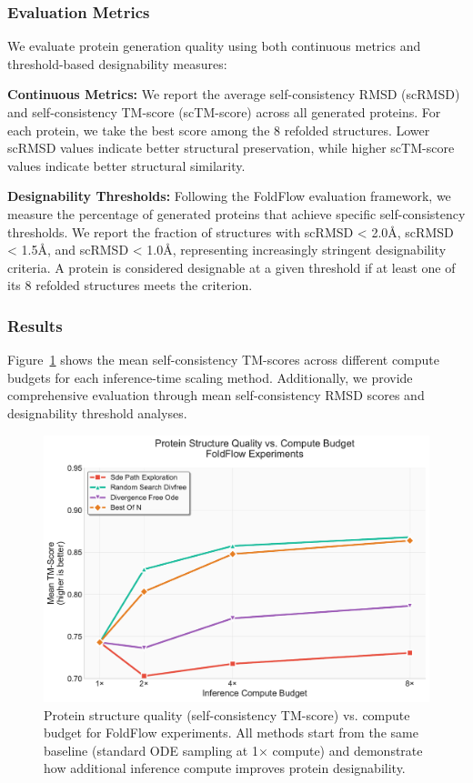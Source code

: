 \documentclass{article}
\begin{document}
\subsubsection{Evaluation Metrics}

We evaluate protein generation quality using both continuous metrics and threshold-based designability measures:

\textbf{Continuous Metrics:} We report the average self-consistency RMSD (scRMSD) and self-consistency TM-score (scTM-score) across all generated proteins. For each protein, we take the best score among the 8 refolded structures. Lower scRMSD values indicate better structural preservation, while higher scTM-score values indicate better structural similarity.

\textbf{Designability Thresholds:} Following the FoldFlow evaluation framework, we measure the percentage of generated proteins that achieve specific self-consistency thresholds. We report the fraction of structures with scRMSD < 2.0Å, scRMSD < 1.5Å, and scRMSD < 1.0Å, representing increasingly stringent designability criteria. A protein is considered designable at a given threshold if at least one of its 8 refolded structures meets the criterion.

\subsubsection{Results}

Figure~\ref{fig:protein-scaling} shows the mean self-consistency TM-scores across different compute budgets for each inference-time scaling method. Additionally, we provide comprehensive evaluation through mean self-consistency RMSD scores and designability threshold analyses.

\begin{figure}[H]
  \centering
  \includegraphics[width=0.8\linewidth]{figures/protein_scaling_tm_score.pdf}
  \caption{Protein structure quality (self-consistency TM-score) vs. compute budget for FoldFlow experiments. All methods start from the same baseline (standard ODE sampling at 1× compute) and demonstrate how additional inference compute improves protein designability.}
  \label{fig:protein-scaling}
\end{figure}
\end{document}
